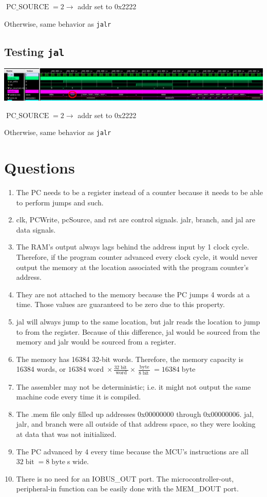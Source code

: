 \documentclass{article}
\DeclareMathOperator\bit{bit}
\DeclareMathOperator\byte{byte}
\DeclareMathOperator\word{word}
\DeclareMathOperator{\pcs}{PC\_SOURCE}
\begin{document}
\begin{landscape}
$\pcs = 2 \rightarrow$ addr set to 0x2222

Otherwise, same behavior as \texttt{jalr}

\subsection{Testing \texttt{jal}}
\includegraphics[width=\linewidth]{30.png}

$\pcs = 2 \rightarrow$ addr set to 0x2222

Otherwise, same behavior as \texttt{jalr}

\end{landscape}

\raggedright
\section{Questions}

\begin{enumerate}
    \item The PC needs to be a register instead of a counter because it needs to be able to perform jumps and such.
    \item clk, PCWrite, pcSource, and rst are control signals. jalr, branch, and jal are data signals.
    \item The RAM's output always lags behind the address input by 1 clock cycle. Therefore, if the program counter
        advanced every clock cycle, it would never output the memory at the location associated with the program counter's
        address.
    \item They are not attached to the memory because the PC jumps 4 words at a time. Those values are guaranteed to be
        zero due to this property.
    \item jal will always jump to the same location, but jalr reads the location to jump to from the register.
        Because of this difference, jal would be sourced from the memory and jalr would be sourced from
        a register.
    \item The memory has 16384 32-bit words. Therefore, the memory capacity is 16384 words, or $16384 \word \times \frac{32 \bit}{\word} \times \frac{\byte}{8 \bit} = 16384 \byte$
    \item The assembler may not be deterministic; i.e. it might not output the same machine code every time it is compiled.
    \item The .mem file only filled up addresses 0x00000000 through 0x00000006. jal, jalr, and branch were all outside
        of that address space, so they were looking at data that was not initialized.
    \item The PC advanced by 4 every time because the MCU's instructions are all $32 \bit = 8 \byte$s wide.
    \item There is no need for an IOBUS\_OUT port. The microcontroller-out, peripheral-in function can be easily done with 
    the MEM\_DOUT port. 
\end{enumerate}
\end{document}

